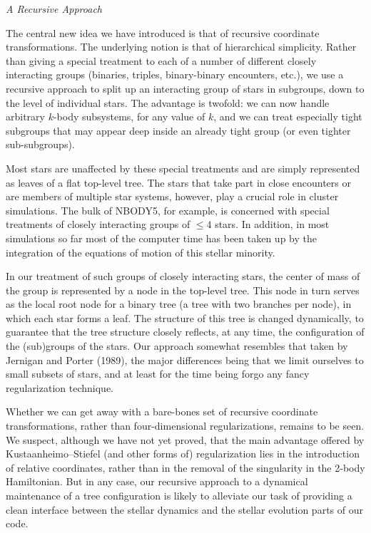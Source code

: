 \bigskip
\noindent
{\it A Recursive Approach}
\medskip

The central new idea we have introduced is that of recursive
coordinate transformations.  The underlying notion is that of
hierarchical simplicity.  Rather than giving a special treatment to
each of a number of different closely interacting groups (binaries,
triples, binary-binary encounters, etc.), we use a recursive approach
to split up an interacting group of stars in subgroups, down to the
level of individual stars.  The advantage is twofold: we can now
handle arbitrary $k$-body subsystems, for any value of $k$, and we can
treat especially tight subgroups that may appear deep inside an
already tight group (or even tighter sub-subgroups).

Most stars are unaffected by these special treatments and are
simply represented as leaves of a flat top-level tree.  The stars
that take part in close encounters or are members of multiple star
systems, however, play a crucial role in cluster simulations.  The
bulk of NBODY5, for example, is concerned with special treatments of
closely interacting groups of $\leq 4$ stars.  In addition, in most
simulations so far most of the computer time has been taken up by the
integration of the equations of motion of this stellar minority.

In our treatment of such groups of closely interacting stars, the
center of mass of the group is represented by a node in the top-level
tree.  This node in turn serves as the local root node for a binary
tree (a tree with two branches per node), in which each star forms a
leaf.  The structure of this tree is changed dynamically, to guarantee
that the tree structure closely reflects, at any time, the
configuration of the (sub)groups of the stars.  Our approach somewhat
resembles that taken by Jernigan and Porter (1989), the major
differences being that we limit ourselves to small subsets of stars,
and at least for the time being forgo any fancy regularization
technique.

Whether we can get away with a bare-bones set of recursive coordinate
transformations, rather than four-dimensional regularizations, remains
to be seen.  We suspect, although we have not yet proved, that the
main advantage offered by Kustaanheimo--Stiefel (and other forms of)
regularization lies in the introduction of relative coordinates,
rather than in the removal of the singularity in the 2-body
Hamiltonian.  But in any case, our recursive approach to a dynamical
maintenance of a tree configuration is likely to alleviate our task of
providing a clean interface between the stellar dynamics and the
stellar evolution parts of our code.

